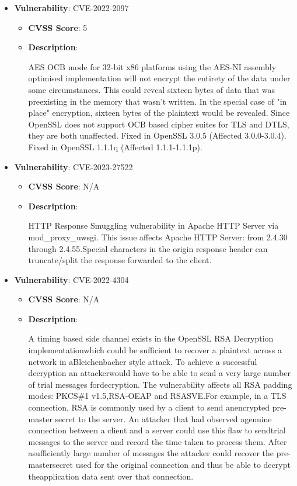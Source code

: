 \documentclass{article}
\begin{document}
\begin{itemize}
        \item \textbf{Vulnerability}: CVE-2022-2097
        \begin{itemize}
            \item \textbf{CVSS Score}:  5 
            \item \textbf{Description}:
            \parbox[t]{0.9\linewidth}{
                \ttfamily AES OCB mode for 32-bit x86 platforms using the AES-NI assembly optimised implementation will not encrypt the entirety of the data under some circumstances. This could reveal sixteen bytes of data that was preexisting in the memory that wasn't written. In the special case of "in place" encryption, sixteen bytes of the plaintext would be revealed. Since OpenSSL does not support OCB based cipher suites for TLS and DTLS, they are both unaffected. Fixed in OpenSSL 3.0.5 (Affected 3.0.0-3.0.4). Fixed in OpenSSL 1.1.1q (Affected 1.1.1-1.1.1p).
            }
        \end{itemize}
    
        \item \textbf{Vulnerability}: CVE-2023-27522
        \begin{itemize}
            \item \textbf{CVSS Score}:  N/A 
            \item \textbf{Description}:
            \parbox[t]{0.9\linewidth}{
                \ttfamily HTTP Response Smuggling vulnerability in Apache HTTP Server via mod\_proxy\_uwsgi. This issue affects Apache HTTP Server: from 2.4.30 through 2.4.55.Special characters in the origin response header can truncate/split the response forwarded to the client.
            }
        \end{itemize}
    
        \item \textbf{Vulnerability}: CVE-2022-4304
        \begin{itemize}
            \item \textbf{CVSS Score}:  N/A 
            \item \textbf{Description}:
            \parbox[t]{0.9\linewidth}{
                \ttfamily A timing based side channel exists in the OpenSSL RSA Decryption implementationwhich could be sufficient to recover a plaintext across a network in aBleichenbacher style attack. To achieve a successful decryption an attackerwould have to be able to send a very large number of trial messages fordecryption. The vulnerability affects all RSA padding modes: PKCS\#1 v1.5,RSA-OEAP and RSASVE.For example, in a TLS connection, RSA is commonly used by a client to send anencrypted pre-master secret to the server. An attacker that had observed agenuine connection between a client and a server could use this flaw to sendtrial messages to the server and record the time taken to process them. After asufficiently large number of messages the attacker could recover the pre-mastersecret used for the original connection and thus be able to decrypt theapplication data sent over that connection.
            }
        \end{itemize}
    

\end{itemize}
\end{document}
